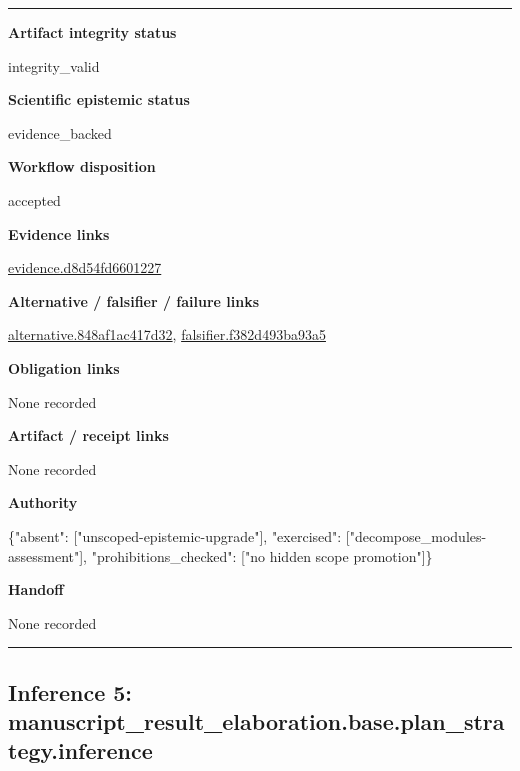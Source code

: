 \documentclass[10pt,a4paper]{article}
\newcommand{\TraceField}[2]{\par\noindent\textbf{#1}\par\noindent #2\par\smallskip}
\newenvironment{TraceDossier}{\par\medskip\noindent\hrule\medskip}{\medskip\hrule\par\medskip}
\begin{document}
\begin{TraceDossier}
\TraceField{Artifact integrity status}{integrity\_\allowbreak{}valid}

\TraceField{Scientific epistemic status}{evidence\_\allowbreak{}backed}

\TraceField{Workflow disposition}{accepted}

\TraceField{Evidence links}{\hyperlink{trace-evidence-a21dcd388fe89a3578}{evidence.\allowbreak{}d8d54fd660\allowbreak{}1227}}

\TraceField{Alternative / falsifier / failure links}{\hyperlink{trace-alternative-28843005e3fd8f4036}{alternativ\allowbreak{}e.\allowbreak{}848af1ac41\allowbreak{}7d32}, \hyperlink{trace-alternative-f3cfad94d3052022ff}{falsifier.\allowbreak{}f382d493ba\allowbreak{}93a5}}

\TraceField{Obligation links}{None recorded}

\TraceField{Artifact / receipt links}{None recorded}

\TraceField{Authority}{\{"absent":\allowbreak{} ["unscoped\allowbreak{}-\allowbreak{}epistemic-\allowbreak{}upgrade"],\allowbreak{} "exercised\allowbreak{}":\allowbreak{} ["decompos\allowbreak{}e\_\allowbreak{}modules-\allowbreak{}assessment\allowbreak{}"], "prohibiti\allowbreak{}ons\_\allowbreak{}checked":\allowbreak{} ["no hidden scope promotion"\allowbreak{}]\}}

\TraceField{Handoff}{None recorded}

\end{TraceDossier}
\pagebreak[2]\subsection{Inference 5: manuscript\allowbreak{}\_\allowbreak{}result\_\allowbreak{}elaboratio\allowbreak{}n.\allowbreak{}base.\allowbreak{}plan\_\allowbreak{}strategy.\allowbreak{}inference}\label{trace-inference-1dfec060069ed59969}
\end{document}
